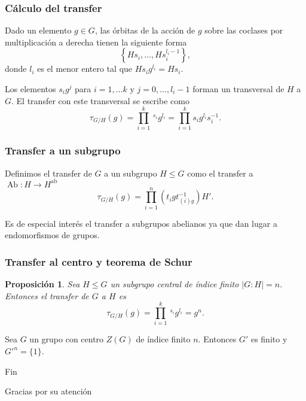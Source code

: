 \documentclass[
	11pt, %
]{beamer}
\DeclareMathOperator{\AbFunctor}{Ab}
\newcommand{\Ab}[1]{#1^\text{ab}}
\newcommand{\ord}[1]{\left|#1\right|}%
\newcommand{\homo}[3]{#1\colon #2\to #3}
\newcommand{\transfer}[2]{\tau_{#1/ #2}}
\newtheorem{proposition}{Proposici\'on}
\begin{document}
\begin{frame}
	\frametitle{Cálculo del transfer}
	Dado un elemento $g\in G$, las órbitas de la acción de $g$ sobre las coclases por multiplicación a derecha tienen la siguiente forma
	$$
		\left\{Hs_i,\ldots,Hs_i^{l_i-1}\right\},
	$$
	donde $l_i$ es el menor entero tal que $Hs_ig^{l_i} = Hs_i$.
	
	Los elementos $s_ig^j$ para $i=1,\ldots k$ y $j=0,\ldots,l_i-1$ forman un transversal de $H$ a $G$.
	\pause
	El transfer con este transversal se escribe como
	$$
		{\transfer G H}(g) = \prod_{i=1}^{k}\,^{s_i}g^{l_i} = \prod_{i=1}^{k}s_ig^{l_i}s_i^{-1}.
	$$
\end{frame}

\begin{frame}
	\frametitle{Transfer a un subgrupo}
	Definimos el transfer de $G$ a un subgrupo $H\leq G$ como el transfer a $\homo \AbFunctor H {\Ab H}$
	$$
		{\transfer G H}(g) = \prod_{i=1}^n \left(t_igt_{(i)g}^{-1}\right)H'.
	$$
	
	Es de especial interés el transfer a subgrupos abelianos ya que dan lugar a endomorfismos de grupos.
\end{frame}

\begin{frame}
	\frametitle{Transfer al centro y teorema de Schur}
	\begin{proposition}
		Sea $H\leq G$ un subgrupo central de índice finito $\ord{G:H} = n$. Entonces el transfer de $G$ a $H$ es
		$$
			{\transfer G H}(g) = \prod_{i=1}^k \,^{s_i}g^{l_i} = g^n.
		$$
	\end{proposition}
	\pause
	\begin{theorem}[Schur]
		Sea $G$ un grupo con centro $Z(G)$ de índice finito $n$. Entonces $G'$ es finito y $G'^n = \{1\}$.
	\end{theorem}
\end{frame}


\begin{frame}[plain] %
	\begin{center}
		{\Huge Fin}
		
		\bigskip\bigskip %
		
		{\LARGE Gracias por su atención}
	\end{center}
\end{frame}

\end{document}
